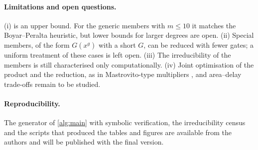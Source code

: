 \documentclass[11pt,a4paper]{article}
\theoremstyle{plain}
\theoremstyle{definition}
\begin{document}
\paragraph{Limitations and open questions.}
(i)  is an upper bound. For the generic members with $m\le10$ it
matches the Boyar--Peralta heuristic, but lower bounds for larger degrees are open.
(ii) Special members, of the form $G(x^g)$ with a short $G$, can be reduced with fewer
gates; a uniform treatment of these cases is left open. (iii) The irreducibility of the
members is still characterised only computationally. (iv) Joint optimisation of the
product and the reduction, as in Mastrovito-type multipliers
\cite{Mastrovito1989,ReyhaniHasan2004}, and area--delay trade-offs remain to be studied.

\paragraph{Reproducibility.}
The generator of \cref{alg:main} with symbolic verification, the irreducibility census
and the scripts that produced the tables and figures are available from the authors and
will be published with the final version.

\printbibliography
\end{document}
